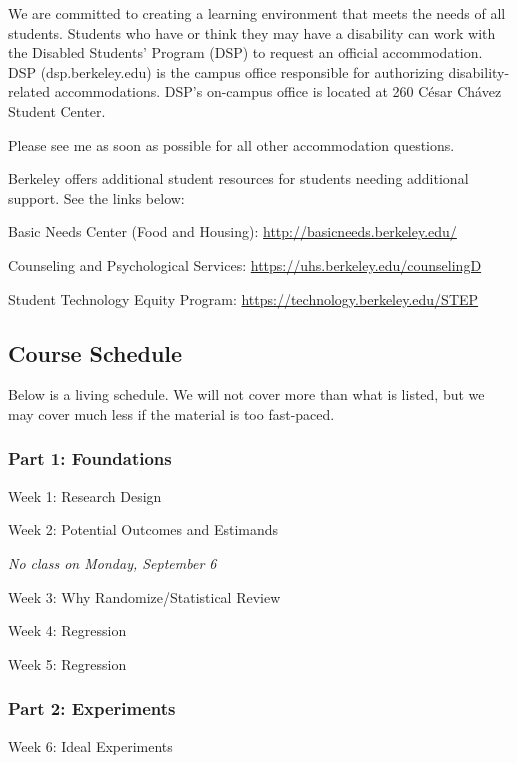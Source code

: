 \documentclass[
  11pt,
]{article}
\begin{document}
We are committed to creating a learning environment that meets the needs
of all students. Students who have or think they may have a disability
can work with the Disabled Students' Program (DSP) to request an
official accommodation. DSP (dsp.berkeley.edu) is the campus office
responsible for authorizing disability-related accommodations. DSP's
on-campus office is located at 260 César Chávez Student Center.

Please see me as soon as possible for all other accommodation questions.

Berkeley offers additional student resources for students needing
additional support. See the links below:

Basic Needs Center (Food and Housing):
\url{http://basicneeds.berkeley.edu/}

Counseling and Psychological Services:
\url{https://uhs.berkeley.edu/counselingD}

Student Technology Equity Program:
\url{https://technology.berkeley.edu/STEP}

\hypertarget{course-schedule}{%
\subsection{Course Schedule}\label{course-schedule}}

Below is a living schedule. We will not cover more than what is listed,
but we may cover much less if the material is too fast-paced.

\hypertarget{part-1-foundations}{%
\subsubsection{Part 1: Foundations}\label{part-1-foundations}}

Week 1: Research Design

Week 2: Potential Outcomes and Estimands

\emph{No class on Monday, September 6}

Week 3: Why Randomize/Statistical Review

Week 4: Regression

Week 5: Regression

\hypertarget{part-2-experiments}{%
\subsubsection{Part 2: Experiments}\label{part-2-experiments}}

Week 6: Ideal Experiments
\end{document}
